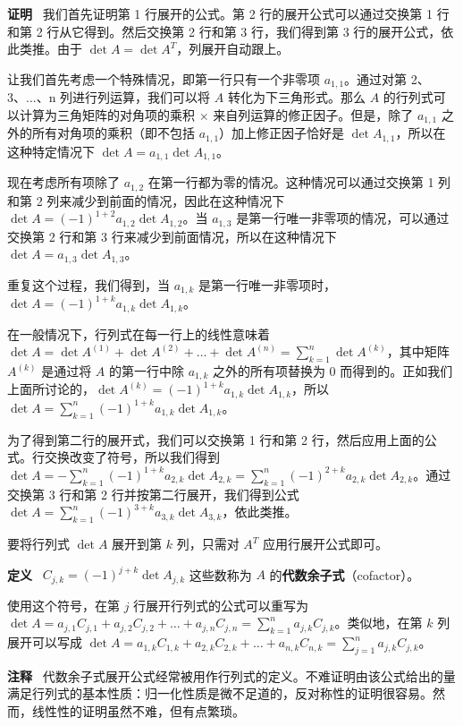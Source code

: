 \textbf{证明}~ 我们首先证明第 1 行展开的公式。第 2 行的展开公式可以通过交换第 1 行和第 2 行从它得到。然后交换第 2 行和第 3 行，我们得到第 3 行的展开公式，依此类推。由于 $\det A = \det A^T$，列展开自动跟上。

让我们首先考虑一个特殊情况，即第一行只有一个非零项 $a_{1,1}$。通过对第 2、3、...、n 列进行列运算，我们可以将 $A$ 转化为下三角形式。那么 $A$ 的行列式可以计算为三角矩阵的对角项的乘积 $\times$ 来自列运算的修正因子。但是，除了 $a_{1,1}$ 之外的所有对角项的乘积（即不包括 $a_{1,1}$）加上修正因子恰好是 $\det A_{1,1}$，所以在这种特定情况下 $\det A = a_{1,1} \det A_{1,1}$。

现在考虑所有项除了 $a_{1,2}$ 在第一行都为零的情况。这种情况可以通过交换第 1 列和第 2 列来减少到前面的情况，因此在这种情况下 $\det A = (-1)^{1+2} a_{1,2} \det A_{1,2}$。当 $a_{1,3}$ 是第一行唯一非零项的情况，可以通过交换第 2 行和第 3 行来减少到前面情况，所以在这种情况下 $\det A = a_{1,3} \det A_{1,3}$。

重复这个过程，我们得到，当 $a_{1,k}$ 是第一行唯一非零项时，$\det A = (-1)^{1+k} a_{1,k} \det A_{1,k}$。

在一般情况下，行列式在每一行上的线性意味着 $\det A = \det A^{(1)} + \det A^{(2)} + \dots + \det A^{(n)} = \sum_{k=1}^n \det A^{(k)}$，其中矩阵 $A^{(k)}$ 是通过将 $A$ 的第一行中除 $a_{1,k}$ 之外的所有项替换为 0 而得到的。正如我们上面所讨论的，$\det A^{(k)} = (-1)^{1+k} a_{1,k} \det A_{1,k}$，所以 $\det A = \sum_{k=1}^n (-1)^{1+k} a_{1,k} \det A_{1,k}$。

为了得到第二行的展开式，我们可以交换第 1 行和第 2 行，然后应用上面的公式。行交换改变了符号，所以我们得到 $\det A = -\sum_{k=1}^n (-1)^{1+k} a_{2,k} \det A_{2,k} = \sum_{k=1}^n (-1)^{2+k} a_{2,k} \det A_{2,k}$。通过交换第 3 行和第 2 行并按第二行展开，我们得到公式 $\det A = \sum_{k=1}^n (-1)^{3+k} a_{3,k} \det A_{3,k}$，依此类推。

要将行列式 $\det A$ 展开到第 $k$ 列，只需对 $A^T$ 应用行展开公式即可。

\textbf{定义}~ $C_{j,k} = (-1)^{j+k} \det A_{j,k}$ 这些数称为 $A$ 的\textbf{代数余子式}（cofactor）。

使用这个符号，在第 $j$ 行展开行列式的公式可以重写为 $\det A = a_{j,1} C_{j,1} + a_{j,2} C_{j,2} + \dots + a_{j,n} C_{j,n} = \sum_{k=1}^n a_{j,k} C_{j,k}$。类似地，在第 $k$ 列展开可以写成 $\det A = a_{1,k} C_{1,k} + a_{2,k} C_{2,k} + \dots + a_{n,k} C_{n,k} = \sum_{j=1}^n a_{j,k} C_{j,k}$。

\textbf{注释}~ 代数余子式展开公式经常被用作行列式的定义。不难证明由该公式给出的量满足行列式的基本性质：归一化性质是微不足道的，反对称性的证明很容易。然而，线性性的证明虽然不难，但有点繁琐。

